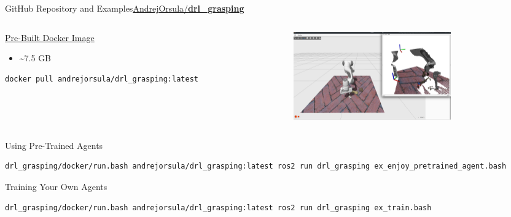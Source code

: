 \begin{frame}[fragile]{GitHub Repository and Examples}{\href{https://github.com/AndrejOrsula/drl_grasping}{AndrejOrsula/\textbf{drl\_grasping}}}
    \vspace{-0.3cm}

    \begin{columns}%
        \begin{column}{0.325\textwidth}%
            \begin{block}{\href{https://hub.docker.com/repository/docker/andrejorsula/drl_grasping}{Pre-Built Docker Image}}
                {\scriptsize%
                    \begin{itemize}
                        \item \textasciitilde7.5 GB
                    \end{itemize}
                }%
                \begin{lstlisting}[language=bash,basicstyle=\tiny,stepnumber=1,numbersep=10pt,tabsize=4,showspaces=false,showstringspaces=false]
        docker pull andrejorsula/drl_grasping:latest
                \end{lstlisting}
            \end{block}
        \end{column}
        \begin{column}{0.6\textwidth}%
            \centering
            \includegraphics[height=3.8cm]{graphics/pre_trained_agent_example.png}
        \end{column}
    \end{columns}

    \begin{block}{Using Pre-Trained Agents}
        \begin{lstlisting}[language=bash,basicstyle=\tiny,stepnumber=1,numbersep=10pt,tabsize=4,showspaces=false,showstringspaces=false]
        drl_grasping/docker/run.bash andrejorsula/drl_grasping:latest ros2 run drl_grasping ex_enjoy_pretrained_agent.bash
        \end{lstlisting}
    \end{block}

    \vspace{0.5cm}

    \begin{block}{Training Your Own Agents}
        \begin{lstlisting}[language=bash,basicstyle=\tiny,stepnumber=1,numbersep=10pt,tabsize=4,showspaces=false,showstringspaces=false]
        drl_grasping/docker/run.bash andrejorsula/drl_grasping:latest ros2 run drl_grasping ex_train.bash
        \end{lstlisting}
    \end{block}
\end{frame}
